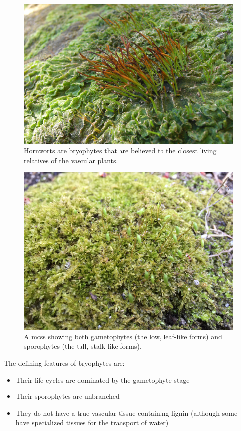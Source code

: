 \begin{figure}

{\centering \includegraphics[width=0.7\linewidth]{./figures/plants/Hornwort_(3144429129)} 

}

\caption{\href{https://commons.wikimedia.org/wiki/File:Hornwort_(3144429129).jpg}{Hornworts are bryophytes that are believed to the closest living relatives of the vascular plants.}}\label{fig:hornwort}
\end{figure}



\begin{figure}

{\centering \includegraphics[width=0.7\linewidth]{./figures/plants/IMG_1227} 

}

\caption{A moss showing both gametophytes (the low, leaf-like forms) and sporophytes (the tall, stalk-like forms).}\label{fig:sporophytemoss}
\end{figure}

The defining features of bryophytes are:

\begin{itemize}
\tightlist
\item
  Their life cycles are dominated by the gametophyte stage
\item
  Their sporophytes are unbranched
\item
  They do not have a true vascular tissue containing lignin (although some have specialized tissues for the transport of water)
\end{itemize}


